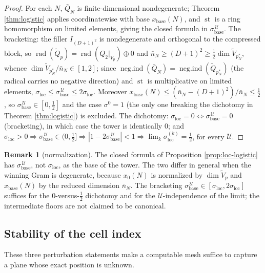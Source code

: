 \documentclass[11pt,reqno]{amsart}
\theoremstyle{definition}
\newtheorem{remark}[theorem]{Remark}
\newcommand{\negind}{\operatorname{neg.ind}}
\newcommand{\sst}{\operatorname{st}}
\newcommand{\half}{\tfrac12}
\begin{document}
\begin{proof}
For each \(N\), \(\bar Q_N\) is finite-dimensional nondegenerate; Theorem
\ref{thm:logistic} applies coordinatewise with base \(x_{\mathrm{base}}(N)\),
and \(\sst\) is a ring homomorphism on limited elements, giving the closed
formula in \(\sigma_{\mathrm{base}}^{\,\mathcal U}\). The bracketing: the filler
\(I_{(D+1)^2}\) is nondegenerate and orthogonal to the compressed block, so
\(\operatorname{rad}(\tilde Q_p)=\operatorname{rad}(Q_2|_{V_p})\oplus0\) and
\(\bar n_N\geq(D+1)^2\geq\tfrac12\dim\tilde V_{p^*_N}\), whence
\(\dim\tilde V_{p^*_N}/\bar n_N\in[1,2]\); since
\(\negind(\bar Q_N)=\negind(\tilde Q_{p^*_N})\) (the radical carries no negative
direction) and \(\sst\) is multiplicative on limited elements,
\(\sigma_{\mathrm{loc}}\leq\sigma_{\mathrm{base}}^{\,\mathcal U}
\leq2\sigma_{\mathrm{loc}}\). Moreover
\(x_{\mathrm{base}}(N)\leq(\bar n_N-(D+1)^2)/\bar n_N\leq\half\), so
\(\sigma_{\mathrm{base}}^{\,\mathcal U}\in[0,\half]\) and the case
\(\sigma^0=1\) (the only one breaking the dichotomy in Theorem
\ref{thm:logistic}) is excluded. The dichotomy: \(\sigma_{\mathrm{loc}}=0\iff
\sigma_{\mathrm{base}}^{\,\mathcal U}=0\) (bracketing), in which case the tower
is identically \(0\); and \(\sigma_{\mathrm{loc}}>0\Rightarrow
\sigma_{\mathrm{base}}^{\,\mathcal U}\in(0,\half]\Rightarrow
|1-2\sigma_{\mathrm{base}}^{\,\mathcal U}|<1\Rightarrow
\lim_k\sigma_{\mathrm{loc}}^{(k)}=\half\), for every \(\mathcal U\).
\end{proof}

\begin{remark}[normalization]\label{rem:radical-bug}
The closed formula of Proposition \ref{prop:loc-logistic} has
\(\sigma_{\mathrm{base}}^{\,\mathcal U}\), not \(\sigma_{\mathrm{loc}}\), as the
base of the tower. The two differ in general when the winning Gram is
degenerate, because \(x_0(N)\) is normalized by \(\dim\tilde V_p\) and
\(x_{\mathrm{base}}(N)\) by the reduced dimension \(\bar n_N\). The bracketing
\(\sigma_{\mathrm{base}}^{\,\mathcal U}\in[\sigma_{\mathrm{loc}},
2\sigma_{\mathrm{loc}}]\) suffices for the \(0\)-versus-\(\half\) dichotomy and
for the \(\mathcal U\)-independence of the limit; the intermediate floors are not
claimed to be canonical.
\end{remark}

\subsection{Stability of the cell index}
These three perturbation statements make a computable mesh suffice to capture a plane
whose exact position is unknown.
\end{document}
